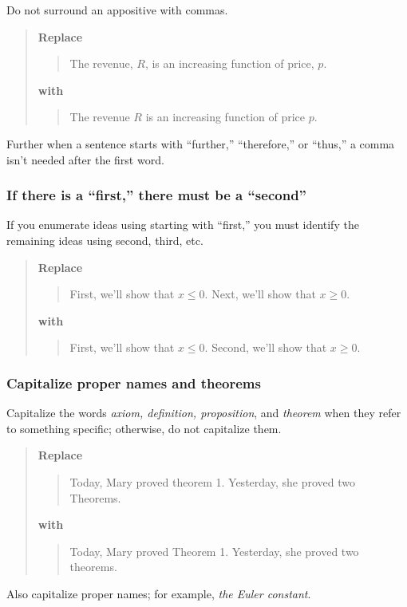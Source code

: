 \documentclass[12pt]{article}
\newcounter{ex}\setcounter{ex}{0}
\newcounter{id}\setcounter{id}{0}
\newcounter{se}\setcounter{se}{0}
\begin{document}
Do not surround an appositive with commas.

\begin{quote}
\textbf{\textbf{Replace}}
\begin{quote}
  The revenue, \(R\), is an increasing function of price, \(p\).
\end{quote}
\textbf{with}
\begin{quote}
  The revenue \(R\) is an increasing function of price \(p\).
\end{quote}
\end{quote}
Further when a sentence starts with ``further,'' ``therefore,'' or ``thus,''
a comma isn't needed after the first word.


 \subsubsection{ If there is a ``first,'' there must be a ``second''}

If you enumerate ideas using starting with ``first,'' you must identify
the remaining ideas using second, third, etc.

\begin{quote}
\textbf{\textbf{Replace}}
\begin{quote}
First, we'll show that \(x \leq 0\). Next, we'll show that
\(x \geq 0\).
\end{quote}
\textbf{with}
\begin{quote}
First, we'll show that \(x \leq 0\).  Second, we'll show that
\mbox{\(x \geq 0\)}.
\end{quote}
\end{quote}



 \subsubsection{  Capitalize proper names and theorems}

Capitalize the words {\em axiom, definition, proposition\/}, and {\em theorem\/}
when they refer to something specific; otherwise, do not
capitalize them.

\begin{quote}
\textbf{\textbf{Replace}}
\begin{quote}
Today, Mary proved theorem 1. Yesterday, she proved two Theorems.
\end{quote}
\textbf{with}
\begin{quote}
Today, Mary proved Theorem 1. Yesterday, she proved two theorems.
\end{quote}
\end{quote}
Also capitalize proper names; for example, \emph{the Euler
constant}. 
\end{document}
